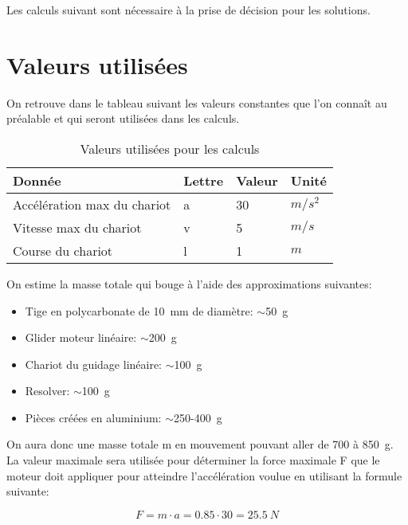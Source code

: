 Les calculs suivant sont nécessaire à la prise de décision pour les solutions.

\section{Valeurs utilisées}\label{sec:ValUtil}
On retrouve dans le tableau suivant les valeurs constantes que l'on connaît au préalable et qui seront utilisées dans les calculs.

\begin{table}[H]
    \centering
    \caption{Valeurs utilisées pour les calculs}
    \label{tab:ValUtil}
    \begin{tabular}{|l|l|l|l|}
        \hline
        \textbf{Donnée}             & \textbf{Lettre} & \textbf{Valeur} & \textbf{Unité} \\ \hline
        Accélération max du chariot & a               & 30              & $m/s^2$        \\ \hline
        Vitesse max du chariot      & v               & 5               & $m/s$          \\ \hline
        Course du chariot           & l               & 1               & $m$            \\ \hline
    \end{tabular}%
\end{table}

On estime la masse totale qui bouge à l'aide des approximations suivantes:
\begin{itemize}
    \item Tige en polycarbonate de 10~mm de diamètre: $\sim$50~g
    \item Glider moteur linéaire: $\sim$200~g
    \item Chariot du guidage linéaire: $\sim$100~g
    \item Resolver: $\sim$100~g
    \item Pièces créées en aluminium: $\sim$250-400~g
\end{itemize}

On aura donc une masse totale m en mouvement pouvant aller de 700 à 850~g. La valeur maximale sera utilisée pour déterminer la force maximale F
que le moteur doit appliquer pour atteindre l'accélération voulue en utilisant la formule suivante:

\begin{equation}\label{eq:ForceMot}
    F = m \cdot a = 0.85 \cdot 30 = 25.5~N
\end{equation}


